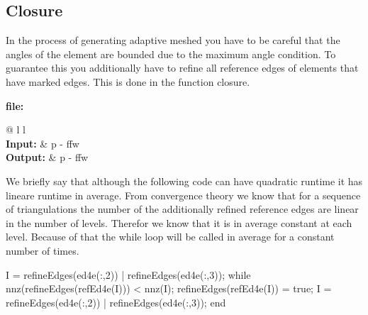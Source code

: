 
\subsection{Closure}
In the process of generating adaptive meshed you have to
be careful that the angles of the element are bounded 
due to the maximum angle condition. To guarantee this you
additionally have to refine all reference edges of elements
that have marked edges.
This is done in the function closure.

\medskip
\noindent
\textbf{file:} \\[1.5ex]
\begin{tabular}{@{} l l}
 \\
\textbf{Input:}  & p - ffw\\
\textbf{Output:} & p - ffw\\
\end{tabular}

\medskip
\noindent
We briefly say that although the following code
can have quadratic runtime it has lineare runtime
in average. From convergence theory we know that for
a sequence of triangulations the number of the additionally refined 
reference edges are linear in the number of levels.
Therefor we know that it is in average constant at each
level. Because of that the while loop will be called
in average for a constant number of times. 
\begin{pcode}
I =  refineEdges(ed4e(:,2)) | refineEdges(ed4e(:,3));
while nnz(refineEdges(refEd4e(I))) < nnz(I);
   refineEdges(refEd4e(I)) = true;
   I =  refineEdges(ed4e(:,2)) | refineEdges(ed4e(:,3));
end
\end{pcode}

